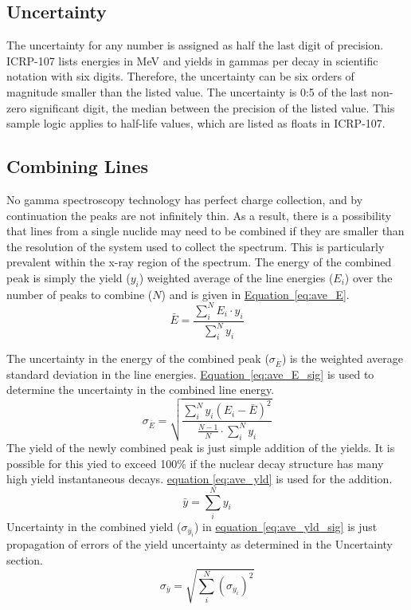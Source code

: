 \documentclass[12pt,report,justified]{SANDreport}
\begin{document}
\subsection{Uncertainty}\label{sec:unc}
The uncertainty for any number is assigned as half the last digit of precision. ICRP-107 lists
energies in MeV and yields in gammas per decay in scientific notation with six digits. Therefore,
the uncertainty can be six orders of magnitude smaller than the listed value. The uncertainty is 0:5
of the last non-zero significant digit, the median between the precision of the listed value. This
sample logic applies to half-life values, which are listed as floats in ICRP-107.

\subsection{Combining Lines}\label{sec:comb_lines}
No gamma spectroscopy technology has perfect charge collection, and by continuation the peaks
are not infinitely thin. As a result, there is a possibility that lines from a single nuclide may need
to be combined if they are smaller than the resolution of the system used to collect the spectrum.
This is particularly prevalent within the x-ray region of the spectrum. The energy of the combined
peak is simply the yield (\(y_i\)) weighted average of the line energies (\(E_i\)) over the number of peaks to
combine (\(N\)) and is given in \hyperref[eq:ave_E]{Equation~\ref{eq:ave_E}}.
\begin{equation}
\bar{E} = \frac{\sum^{N}_{i} E_i \cdot y_i}{\sum^{N}_{i}y_i}
\label{eq:ave_E}
\end{equation}

The uncertainty in the energy of the combined peak (\( \sigma _{\bar{E}}\)) is the weighted average standard deviation
in the line energies. \hyperref[eq:ave_E_sig]{Equation~\ref{eq:ave_E_sig}} is used to determine the uncertainty in the combined line energy.
\[
\sigma_{\bar{E}} = \sqrt{\frac{\sum^{N}_{i} y_i \left( E_i - \bar{E} \right) ^2}{ \frac{N-1}{N} \cdot \sum^{N}_{i} y_i}}
\label{eq:ave_E_sig}
\]
The yield of the newly combined peak is just simple addition of the yields. It is possible for this
yied to exceed 100\% if the nuclear decay structure has many high yield instantaneous decays.
\hyperref[eq:ave_yld]{equation \ref{eq:ave_yld}} is used for the addition.
\[
\bar{y} = \sum^N_i y_i
\label{eq:ave_yld}
\]
Uncertainty in the combined yield (\( \sigma _{\bar{y_i}} \)) in \hyperref[eq:ave_yld_sig]{equation~\ref{eq:ave_yld_sig}} is just propagation of errors of the yield
uncertainty as determined in the Uncertainty section.
\[
\sigma_{\bar{y}} = \sqrt{\sum^N_i \left( \sigma_{y_i} \right) ^2}
\label{eq:ave_yld_sig}
\]
\end{document}
